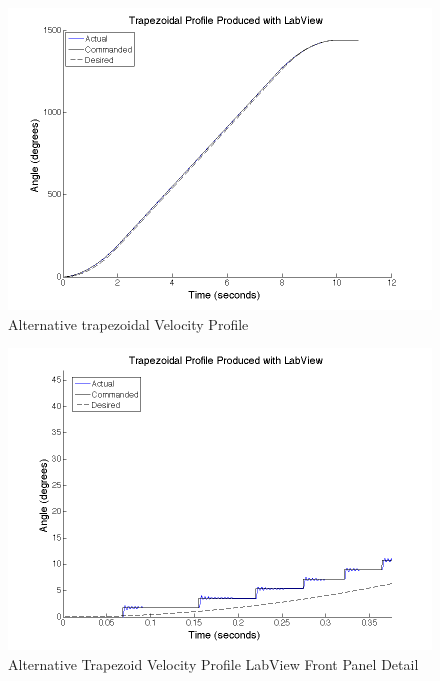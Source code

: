 \documentclass{article}
\theoremstyle{plain}
\theoremstyle{definition}
\theoremstyle{remark}
\begin{document}
\begin{figure}
\begin{center}
\includegraphics[width = 12cm]{labViewProfile.png}
\caption{Alternative trapezoidal Velocity Profile}
\label{Q4a_Alt3}
\end{center}
\end{figure}

\begin{figure}
\begin{center}
\includegraphics[width = 12cm]{labViewProfile_Detail2.png}
\caption{Alternative Trapezoid Velocity Profile LabView Front Panel Detail}
\label{Q4a_Alt4}
\end{center}
\end{figure}
\end{document}
